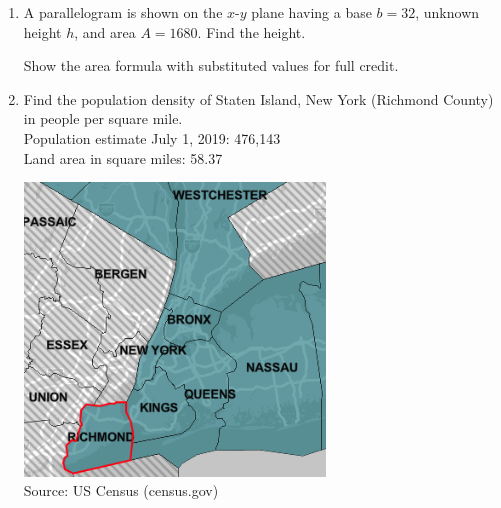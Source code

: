 \begin{enumerate}
\item A parallelogram is shown on the $x$-$y$ plane having a base $b=32$, unknown height $h$, and area $A=1680$. Find the height. 
  \begin{multicols}{2}
    Show the area formula with substituted values for full credit.
      \begin{flushright}
      \end{flushright}
  \end{multicols} 

\item Find the population density of Staten Island, New York (Richmond County) in people per square mile.\\[0.5cm]
Population estimate July 1, 2019: 476,143\\[0.25cm]
Land area in square miles: 58.37
\begin{flushright}
  \includegraphics[width=8cm]{../graphics/04StatenIsland.png}\\
  Source: US Census (census.gov)
\end{flushright}


\end{enumerate}

